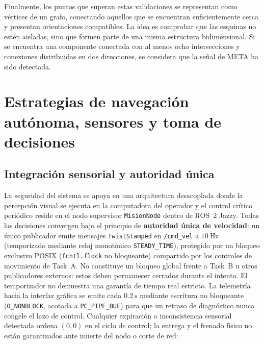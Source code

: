 \documentclass[11pt,a4paper]{article}
\begin{document}
Finalmente, los puntos que superan estas validaciones se representan como vértices de un grafo, conectando aquellos que se encuentran suficientemente cerca y presentan orientaciones compatibles. La idea es comprobar que las esquinas no estén aisladas, sino que formen parte de una misma estructura bidimensional. Si se encuentra una componente conectada con al menos ocho intersecciones y conexiones distribuidas en dos direcciones, se considera que la señal de META ha sido detectada.
\section{Estrategias de navegación autónoma, sensores y toma de decisiones}

\subsection{Integración sensorial y autoridad única}

La seguridad del sistema se apoya en una arquitectura desacoplada donde la
percepción visual se ejecuta en la computadora del operador y el control crítico
periódico reside en el nodo supervisor \texttt{MisionNode} dentro de
ROS~2 Jazzy. Todas las decisiones convergen bajo el principio de
\textbf{autoridad única de velocidad}: un único publicador emite mensajes
\texttt{TwistStamped} en \texttt{/cmd\_vel} a $10\ \mathrm{Hz}$ (temporizado
mediante reloj monotónico \texttt{STEADY\_TIME}), protegido por un bloqueo
exclusivo POSIX (\texttt{fcntl.flock} no bloqueante) compartido por los
controles de movimiento de Task~A. No constituye un bloqueo global frente a
Task~B u otros publicadores externos: estos deben permanecer cerrados durante
el intento. El temporizador no demuestra una garantía de tiempo real estricto. La telemetría hacia la interfaz gráfica se
emite cada $0.2\ \mathrm{s}$ mediante escritura no bloqueante
(\texttt{O\_NONBLOCK}, acotada a \texttt{PC\_PIPE\_BUF}) para que un retraso de
diagnóstico nunca congele el lazo de control. Cualquier expiración o
inconsistencia sensorial detectada ordena $(0,0)$ en el ciclo de control; la
entrega y el frenado físico no están garantizados ante muerte del nodo o
corte de red:
\end{document}
